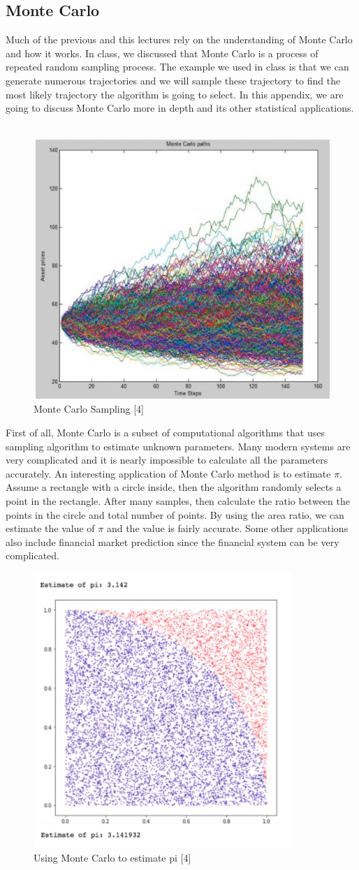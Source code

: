 \documentclass[11pt]{article}
\begin{document}
\subsection{Monte Carlo}
Much of the previous and this lectures rely on the understanding of Monte Carlo and how it works. In class, we discussed that Monte Carlo is a process of repeated random sampling process. The example we used in class is that we can generate numerous trajectories and we will sample these trajectory to find the most likely trajectory the algorithm is going to select. In this appendix, we are going to discuss Monte Carlo more in depth and its other statistical applications.\\ \\
\begin{figure}[H]
    \centering
    \includegraphics[width=0.35\linewidth]{images/Monte Carlo Sampling .png}
    \caption{Monte Carlo Sampling [4]}
    \label{fig:lambda-return_params}
\end{figure}

First of all, Monte Carlo is a subset of computational algorithms that uses sampling algorithm to estimate unknown parameters. Many modern systems are very complicated and it is nearly impossible to calculate all the parameters accurately. An interesting application of Monte Carlo method is to estimate $\pi$. Assume a rectangle with a circle inside, then the algorithm randomly selects a point in the rectangle. After many samples, then calculate the ratio between the points in the circle and total number of points. By using the area ratio, we can estimate the value of $\pi$ and the value is fairly accurate. Some other applications also include financial market prediction since the financial system can be very complicated.  
\begin{figure}[H]
    \centering
    \includegraphics[width=0.35\linewidth]{images/pi estimation.png}
    \caption{Using Monte Carlo to estimate pi [4]}
    \label{fig:lambda-return_params}
\end{figure}
\end{document}
